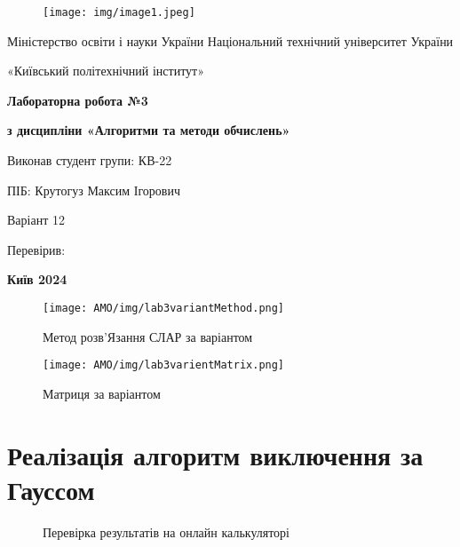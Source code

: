 \documentclass{article}
\begin{document}
\begin{figure}[h!]
\centering
\texttt{[image: img/image1.jpeg]}
\label{fig:example}
\end{figure}
\begin{center}
Міністерство освіти і науки України Національний технічний університет України
\end{center}
\begin{center}
    «Київський політехнічний інститут»
\end{center}
\vspace{4cm}
\begin{center}
\Large \textbf{Лабораторна робота №3}
\end{center}
\begin{center}
    \textbf{з дисципліни «Алгоритми та методи обчислень»}
\end{center}
\vspace{4cm}

\hspace*{8cm} Виконав студент групи: КВ-22 \par
\hspace*{8cm} ПІБ: Крутогуз Максим Ігорович \par
\hspace*{8cm} Варіант 12 \par
\hspace*{8cm} Перевірив: 

\vspace{7cm}
\begin{center}
    \textbf{Київ 2024}
\end{center}


\begin{figure}
\centering
\texttt{[image: AMO/img/lab3variantMethod.png]}
\caption{Метод розв'Язання СЛАР за варіантом}
\label{fig:var1}
\end{figure}

\begin{figure}
\centering
\texttt{[image: AMO/img/lab3varientMatrix.png]}
\caption{Матриця за варіантом}
\label{fig:var2}
\end{figure}

\section{Реалізація алгоритм виключення за Гауссом}

\begin{figure}
\centering
{}
\hspace*{\fill} %
\caption{Перевірка результатів на онлайн калькуляторі}
\label{fig:ls1}
\end{figure}
\end{document}
